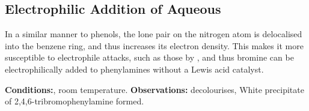 




		\subsection{Electrophilic Addition of Aqueous }

			In a similar manner to phenols, the lone pair on the nitrogen atom is delocalised into the benzene ring, and thus increases its
			electron density. This makes it more susceptible to electrophile attacks, such as those by , and thus bromine can be
			electrophilically added to phenylamines without a Lewis acid catalyst.

			\vspace{1.5em}
			\vbox{\textbf{Conditions:}\tabto{35mm}, room temperature.}\vspace{0.75em}
			\vbox{\textbf{Observations:}\tabto{35mm}  decolourises,
										\tabto{35mm}White precipitate of 2,4,6-tribromophenylamine formed.}







